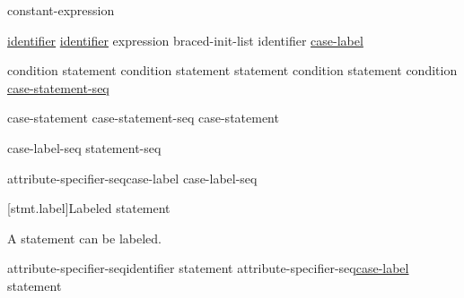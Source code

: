 \documentclass[ebook,10pt,oneside,openany,final]{memoir}
\begin{document}
\begin{bnf}
\br
     constant-expression\br
    \br
\end{bnf}

\begin{bnf}
\br
     \underline{identifier\opt} \terminal{;}\br
     \underline{identifier\opt} \terminal{;}\br
     expression\opt \terminal{;}\br
     braced-init-list \terminal{;}\br
     identifier \terminal{;}\br
     \underline{case-label} \terminal{;}\br
\end{bnf}

\begin{bnf}
\br
     condition \terminal{)} statement\br
     condition \terminal{)} statement  statement\br
     condition \terminal{)} statement\br
     condition \terminal{) \{} \underline{case-statement-seq} \terminal{\}}\br
\end{bnf}

\begin{shaded}

\begin{bnf}
\br
    case-statement\br
    case-statement-seq case-statement\br
\end{bnf}

\begin{bnf}
\br
    case-label-seq statement-seq\br
\end{bnf}

\begin{bnf}
\br
    attribute-specifier-seq\opt case-label \terminal{:} case-label-seq\opt\br
\end{bnf}

\end{shaded}

[stmt.label]{Labeled statement}

\pnum
A statement can be labeled.

\begin{bnf}
\br
    attribute-specifier-seq\opt identifier \terminal{:} statement\br
    attribute-specifier-seq\opt \underline{case-label} \terminal{:} statement\br
\end{bnf}
\end{document}
